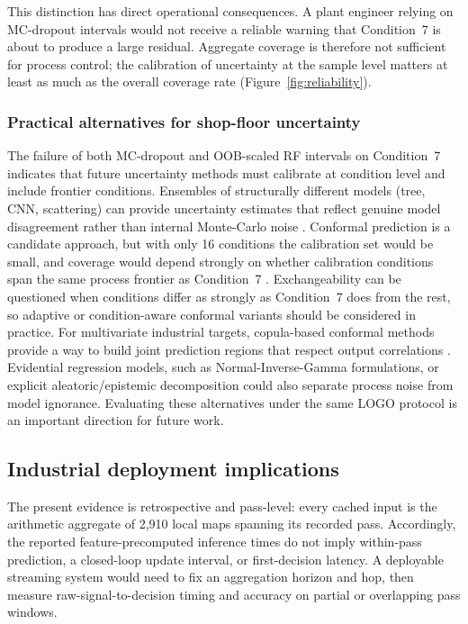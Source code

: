 This distinction has direct operational consequences. A plant engineer
relying on MC-dropout intervals would not receive a reliable warning that
Condition~7 is about to produce a large residual. Aggregate coverage is
therefore not sufficient for process control; the calibration of
uncertainty at the sample level matters at least as much as the overall
coverage rate (Figure~\ref{fig:reliability}).

\subsubsection{Practical alternatives for shop-floor
uncertainty}\label{shop-floor-uncertainty}

The failure of both MC-dropout and OOB-scaled RF intervals on Condition~7
indicates that future uncertainty methods must calibrate at condition
level and include frontier conditions. Ensembles of
structurally different models (tree, CNN, scattering) can provide
uncertainty estimates that reflect genuine model disagreement rather than
internal Monte-Carlo noise \cite{lakshminarayanan2017simple}. Conformal
prediction is a candidate approach, but with only 16 conditions the calibration set would be small, and coverage would depend strongly on whether calibration conditions span the same process frontier as Condition~7 \cite{Angelopoulos2023}.
Exchangeability can be questioned when conditions differ as strongly as
Condition~7 does from the rest, so adaptive or condition-aware conformal
variants should be considered in practice. For multivariate industrial
targets, copula-based conformal methods provide a way to build joint
prediction regions that respect output correlations
\cite{zhang2023improved}. Evidential regression models, such as Normal-Inverse-Gamma
formulations, or explicit aleatoric/epistemic decomposition could also
separate process noise from model ignorance.
Evaluating these alternatives under the same LOGO protocol is an important
direction for future work.

\subsection{Industrial deployment
implications}\label{industrial-deployment}

The present evidence is retrospective and pass-level: every cached input is
the arithmetic aggregate of 2,910 local maps spanning its recorded pass.
Accordingly, the reported feature-precomputed inference times do not imply
within-pass prediction, a closed-loop update interval, or first-decision
latency. A deployable streaming system would need to fix an aggregation
horizon and hop, then measure raw-signal-to-decision timing and accuracy on
partial or overlapping pass windows.

